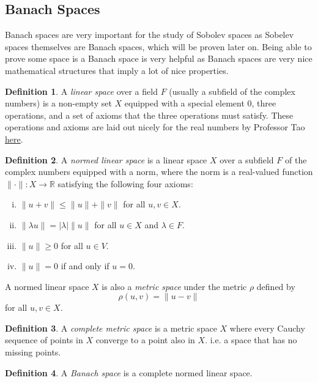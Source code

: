 \documentclass[11pt]{article}
\theoremstyle{definition}
\newtheorem*{definition}{Definition}
\begin{document}
\subsection{Banach Spaces}
Banach spaces are very important for the study of Sobolev spaces as Sobelev spaces themselves are Banach spaces, which will be proven later on.
Being able to prove some space is a Banach space is very helpful as Banach spaces are very nice mathematical structures that imply
a lot of nice properties.
\begin{definition}
	A \textit{linear space} over a field $F$ (usually a subfield of the complex numbers) is a non-empty set $X$ equipped with a special element 0, 
	three operations, and a set of
	axioms that the three operations must satisfy. These operations and axioms are laid out nicely for the real numbers by Professor Tao
	\href{https://www.math.ucla.edu/~tao/resource/general/121.1.00s/vector_axioms.html}{here}.
\end{definition}
\begin{definition}
	A \textit{normed linear space} is a linear space $X$ over a subfield $F$ of the complex numbers equipped with a norm,
	where the norm is a real-valued function $\|\cdot\| : X \rightarrow \mathbb{R}$ satisfying the following four axioms:
	\begin{enumerate}[(i)]
		\item $\|u+v\| \leq \|u\|+\|v\|$ for all $u,v \in X$.
		\item $\|\lambda u\| = |\lambda|\|u\|$ for all $u \in X$ and $\lambda \in F$.
		\item $\|u\| \geq 0$ for all $u \in V$.
		\item $\|u\| = 0$ if and only if $u=0$.
	\end{enumerate}
	A normed linear space $X$ is also a \textit{metric space} under the metric $\rho$ defined by
	\[\rho(u,v) = \|u-v\|\]
	for all $u,v \in X$.
\end{definition}
\begin{definition}
	A \textit{complete metric space} is a metric space $X$ where every Cauchy sequence of points in $X$ converge to a point also in $X$.
	i.e. a space that has no missing points.
\end{definition}
\begin{definition}
	A \textit{Banach space} is a complete normed linear space.
\end{definition}

\newpage
\end{document}
